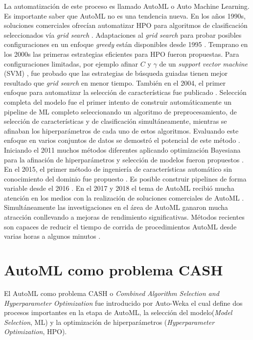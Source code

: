 La automatización de este proceso es llamado AutoML o Auto Machine Learning. Es importante saber que AutoML no es una tendencia nueva. En los años 1990s, soluciones comerciales ofrecían automatizar HPO para algoritmos de clasificación seleccionados vía \textit{grid search} \parencite{17}. Adaptaciones al \textit{grid search} para probar posibles configuraciones en un enfoque \textit{greedy} están disponibles desde 1995 \parencite{18}. Temprano en los 2000s las primeras estrategias eficientes para HPO fueron propuestas. Para configuraciones limitadas, por ejemplo afinar $C$ y $\gamma$ de un \textit{support vector machine} (SVM) \parencite{19} \parencite{20}, fue probado que las estrategias de búsqueda guiadas tienen mejor resultado que \textit {grid search} en menor tiempo. También en el 2004, el primer enfoque para automatizar la selección de características fue publicado \parencite{21}. Selección completa del modelo \parencite{22} fue el primer intento de construir automáticamente un pipeline de ML completo seleccionando un algoritmo de preprocesamiento, de selección de características y de clasificación simultáneamente, mientras se afinaban los hiperparámetros de cada uno de estos algoritmos. Evaluando este enfoque en varios conjuntos de datos se demostró el potencial de este método \parencite{23}. Iniciando el 2011 muchos métodos diferentes aplicando optimización Bayesiana para la afinación de hiperparámetros \parencite{24} \parencite{8} y selección de modelos fueron propuestos \parencite{13}. En el 2015, el primer método de ingeniería de características automático sin conocimiento del dominio fue propuesto \parencite{26}. Es posible construir pipelines de forma variable desde el 2016 \parencite{27}. En el 2017 y 2018 el tema de AutoML recibió mucha atención en los medios con la realización de soluciones comerciales de AutoML \parencite{28} \parencite{29} \parencite{30} \parencite{31}. Simultáneamente las investigaciones en el área de AutoML ganaron mucha atracción conllevando a mejoras de rendimiento significativas. Métodos recientes son capaces de reducir el tiempo de corrida de procedimientos AutoML desde varias horas a algunos minutos \parencite{32}.

\section{AutoML como problema CASH}

El AutoML como problema CASH o \textit{Combined Algorithm Selection and Hyperparameter Optimization} fue introducido por Auto-Weka el cual define dos procesos importantes en la etapa de AutoML, la selección del modelo(\textit{Model Selection}, ML) y la optimización de hiperparámetros (\textit{Hyperparameter Optimization}, HPO).

